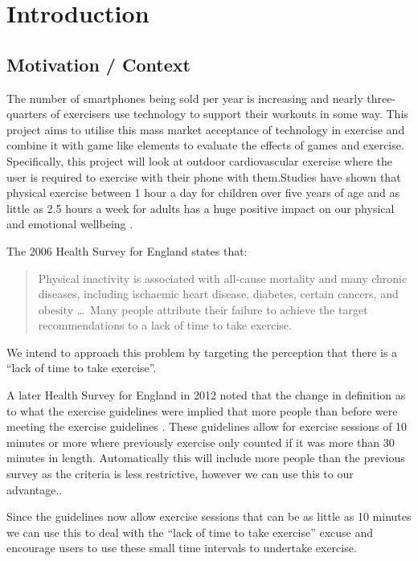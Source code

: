\chapter{Introduction}\label{ch_intro}

\section{Motivation / Context}
The number of smartphones being sold per year is
increasing\cite{phones_gartner, phones_guardian} and nearly
three-quarters of exercisers use technology to support their
workouts in some way\cite{lifefitness}. This project aims to utilise
this mass market 
acceptance of technology in exercise and combine it with game like
elements to evaluate the effects of games and
exercise. Specifically, this project will look at outdoor
cardiovascular exercise where the user is required to exercise with
their phone with them.Studies have shown that physical exercise
between 1 hour a day for children over five years of age and as
little as 2.5 hours a week for adults has a huge positive impact on
our physical and emotional wellbeing\cite{govsurvey, amsurvey} .

The 2006 Health Survey for England\cite{exercise} states that: 
\begin{quote}
  Physical inactivity is associated with all-cause mortality and
  many chronic diseases, including ischaemic heart disease, diabetes,
  certain cancers, and obesity \dots \ Many people attribute their
  failure to achieve the target recommendations to a lack of time to
  take exercise. 
\end{quote} 
We intend to approach this problem by targeting the perception that
there is a ``lack of time to take exercise''. 

A later Health Survey for England in 2012 noted that the change in
definition as to what the exercise guidelines were implied that more
people than before were meeting the exercise guidelines
\cite{exercise_2012}. These guidelines allow for exercise sessions of
10 minutes or more where previously exercise only counted if it was
more than 30 minutes in length. Automatically this will include
more people than the previous survey as the criteria is less
restrictive, however we can use this to our advantage..

Since the guidelines now allow exercise sessions that can be as little
as 10 minutes we can use this to deal with the ``lack of time to take
exercise'' excuse and encourage users to use these small time
intervals to undertake exercise. 

